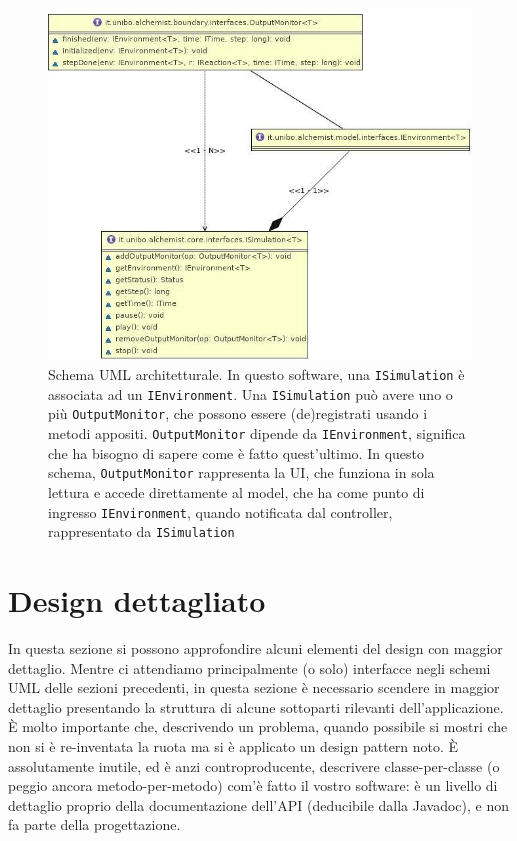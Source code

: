 \documentclass[a4paper,12pt]{report}
\begin{document}
\begin{figure}
\centering{}
\includegraphics[width=\textwidth]{img/goodarch}
\caption{Schema UML architetturale. In questo software, una \texttt{ISimulation} è associata ad un \texttt{IEnvironment}. Una \texttt{ISimulation} può avere uno o più \texttt{OutputMonitor}, che possono essere (de)registrati usando i metodi appositi. \texttt{OutputMonitor} dipende da \texttt{IEnvironment}, significa che ha bisogno di sapere come è fatto quest'ultimo. In questo schema, \texttt{OutputMonitor} rappresenta la UI, che funziona in sola lettura e accede direttamente al model, che ha come punto di ingresso \texttt{IEnvironment}, quando notificata dal controller, rappresentato da \texttt{ISimulation}}
\label{img:goodarch}
\end{figure}


\section{Design dettagliato}

In questa sezione si possono approfondire alcuni elementi del design con maggior dettaglio.
%
Mentre ci attendiamo principalmente (o solo) interfacce negli schemi UML delle sezioni precedenti, in questa sezione è necessario scendere in maggior dettaglio presentando la struttura di alcune sottoparti rilevanti dell'applicazione.
%
È molto importante che, descrivendo un problema, quando possibile si mostri che non si è re-inventata la ruota ma si è applicato un design pattern noto.
%
È assolutamente inutile, ed è anzi controproducente, descrivere classe-per-classe (o peggio ancora metodo-per-metodo) com'è fatto il vostro software: è un livello di dettaglio proprio della documentazione dell'API (deducibile dalla Javadoc), e non fa parte della progettazione.
\end{document}
